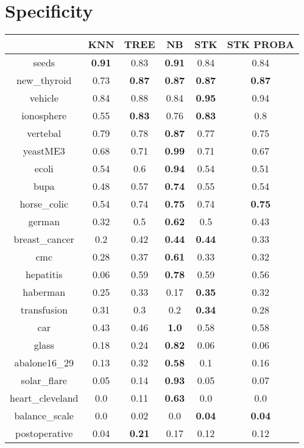 \documentclass{article}%
\begin{document}
\section*{Specificity}%
\begin{tabular}{c|ccccc}%
&KNN&TREE&NB&STK&STK PROBA\\%
\hline%
seeds&\textbf{0.91}&0.83&\textbf{0.91}&0.84&0.84\\%
new\_thyroid&0.73&\textbf{0.87}&\textbf{0.87}&\textbf{0.87}&\textbf{0.87}\\%
vehicle&0.84&0.88&0.84&\textbf{0.95}&0.94\\%
ionosphere&0.55&\textbf{0.83}&0.76&\textbf{0.83}&0.8\\%
vertebal&0.79&0.78&\textbf{0.87}&0.77&0.75\\%
yeastME3&0.68&0.71&\textbf{0.99}&0.71&0.67\\%
ecoli&0.54&0.6&\textbf{0.94}&0.54&0.51\\%
bupa&0.48&0.57&\textbf{0.74}&0.55&0.54\\%
horse\_colic&0.54&0.74&\textbf{0.75}&0.74&\textbf{0.75}\\%
german&0.32&0.5&\textbf{0.62}&0.5&0.43\\%
breast\_cancer&0.2&0.42&\textbf{0.44}&\textbf{0.44}&0.33\\%
cmc&0.28&0.37&\textbf{0.61}&0.33&0.32\\%
hepatitis&0.06&0.59&\textbf{0.78}&0.59&0.56\\%
haberman&0.25&0.33&0.17&\textbf{0.35}&0.32\\%
transfusion&0.31&0.3&0.2&\textbf{0.34}&0.28\\%
car&0.43&0.46&\textbf{1.0}&0.58&0.58\\%
glass&0.18&0.24&\textbf{0.82}&0.06&0.06\\%
abalone16\_29&0.13&0.32&\textbf{0.58}&0.1&0.16\\%
solar\_flare&0.05&0.14&\textbf{0.93}&0.05&0.07\\%
heart\_cleveland&0.0&0.11&\textbf{0.63}&0.0&0.0\\%
balance\_scale&0.0&0.02&0.0&\textbf{0.04}&\textbf{0.04}\\%
postoperative&0.04&\textbf{0.21}&0.17&0.12&0.12\\%
\end{tabular}

%
\end{document}
